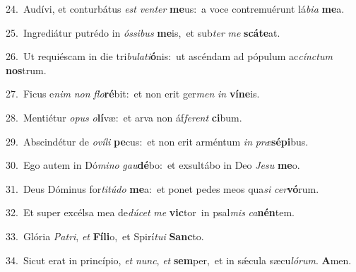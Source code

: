 {\numbfont\textcolor{\numbcolor}{24.}}~Audívi, et conturbátus \textit{est} \textit{ven}\-\textit{ter} \textbf{me}\-us:~\star a voce contremuérunt lá\-\textit{bi}\-\textit{a} \textbf{me}\-a.\par
{\numbfont\textcolor{\numbcolor}{25.}}~Ingrediátur putrédo in \textit{ós}\-\textit{si}\textit{bus} \textbf{me}\-is,~\star et sub\textit{ter} \textit{me} \textbf{scá}\-\textbf{te}at.\par
{\numbfont\textcolor{\numbcolor}{26.}}~Ut requiéscam in die tri\-\textit{bu}\-\textit{la}\textit{ti}\textbf{ó}nis:~\star ut ascéndam ad pópulum ac\-\textit{cínc}\-\textit{tum} \textbf{nos}\-trum.\par
{\numbfont\textcolor{\numbcolor}{27.}}~Ficus e\textit{nim} \textit{non} \textit{flo}\-\textbf{ré}bit:~\star et non erit ger\textit{men} \textit{in} \textbf{ví}\-\textbf{ne}is.\par
{\numbfont\textcolor{\numbcolor}{28.}}~Mentiétur \textit{o}\-\textit{pus} \textit{o}\-\textbf{lí}væ:~\star et arva non áf\-\textit{fe}\-\textit{rent} \textbf{ci}\-bum.\par
{\numbfont\textcolor{\numbcolor}{29.}}~Abscindétur de \textit{o}\-\textit{ví}\textit{li} \textbf{pe}\-cus:~\star et non erit arméntum \textit{in} \textit{præ}\-\textbf{sé}\textbf{pi}bus.\par
{\numbfont\textcolor{\numbcolor}{30.}}~Ego autem in Dó\-\textit{mi}\-\textit{no} \textit{gau}\-\textbf{dé}bo:~\star et exsultábo in Deo \textit{Je}\-\textit{su} \textbf{me}\-o.\par
{\numbfont\textcolor{\numbcolor}{31.}}~Deus Dóminus for\-\textit{ti}\-\textit{tú}\textit{do} \textbf{me}\-a:~\star et ponet pedes meos qua\textit{si} \textit{cer}\-\textbf{vó}rum.\par
{\numbfont\textcolor{\numbcolor}{32.}}~Et super excélsa mea de\-\textit{dú}\-\textit{cet} \textit{me} \textbf{vic}\-tor~\star in psal\textit{mis} \textit{ca}\-\textbf{nén}tem.\par
{\numbfont\textcolor{\numbcolor}{33.}}~Glória \textit{Pa}\-\textit{tri}, \textit{et} \textbf{Fí}\-\textbf{li}o,~\star et Spirí\-\textit{tu}\-\textit{i} \textbf{Sanc}\-to.\par
{\numbfont\textcolor{\numbcolor}{34.}}~Sicut erat in princípio, \textit{et} \textit{nunc}\-, \textit{et} \textbf{sem}\-per,~\star et in sǽcula sæcu\-\textit{ló}\-\textit{rum}. \textbf{A}\-men.\par
